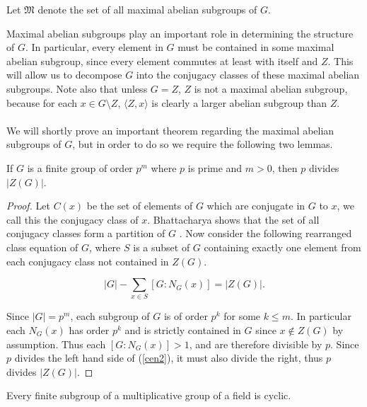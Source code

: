 \begin{notation-non} Let $\mathfrak{M}$ denote the set of all maximal abelian subgroups of $G$.
\end{notation-non}
\vspace{3mm}

Maximal abelian subgroups play an important role in determining the structure of $G$. In particular, every element in $G$ must be contained in some maximal abelian subgroup, since every element commutes at least with itself and $Z$. This will allow us to decompose $G$ into the conjugacy classes of these maximal abelian subgroups. Note also that unless $G=Z$, $Z$ is not a maximal abelian subgroup, because for each $x \in G \! \setminus \! Z$, $\langle Z,x \rangle$ is clearly a larger abelian subgroup than $Z$. \\
\\
We will shortly prove an important theorem regarding the maximal abelian subgroups of $G$, but in order to do so we require the following two lemmas. \\

\begin{lemma}\label{primecentre}
If $G$ is a finite group of order $p^m$ where $p$ is prime and $m>0$, then $p$ divides $|Z(G)|$. 
\end{lemma}

\begin{proof}
Let $C(x)$ be the set of elements of $G$ which are conjugate in $G$ to $x$, we call this the conjugacy class of $x$. Bhattacharya shows that the set of all conjugacy classes form a partition of $G$ \cite[p.112]{bhattacharya}. Now consider the following rearranged class equation of $G$, where $S$ is a subset of $G$ containing exactly one element from each conjugacy class not contained in $Z(G)$. 
 
\begin{equation} \label{cen2}
|G| - \sum_{x \in S} [G:N_G(x)] = |Z(G)|.
\end{equation}

Since $|G| = p^m$, each subgroup of $G$ is of order $p^k$ for some $k \leq m$. In particular each $N_G(x)$ has order $p^k$ and is strictly contained in $G$ since $x \not \in Z(G)$ by assumption. Thus each $[G:N_G(x)] > 1$, and are therefore divisible by $p$. Since $p$ divides the left hand side of (\ref{cen2}), it must also divide the right, thus $p$ divides $|Z(G)|$. 

\end{proof}

\begin{lemma}\label{finsubcyc}
Every finite subgroup of a multiplicative group of a field is cyclic.
\end{lemma}

